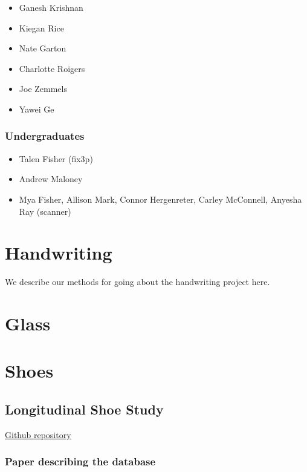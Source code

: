\documentclass[]{book}
\providecommand{\tightlist}{%
  \setlength{\itemsep}{0pt}\setlength{\parskip}{0pt}}
\begin{document}
\begin{itemize}
\tightlist
\item
  Ganesh Krishnan
\item
  Kiegan Rice
\item
  Nate Garton
\item
  Charlotte Roigers
\item
  Joe Zemmels
\item
  Yawei Ge
\end{itemize}

\hypertarget{undergraduates}{%
\subsection{Undergraduates}\label{undergraduates}}

\begin{itemize}
\tightlist
\item
  Talen Fisher (fix3p)
\item
  Andrew Maloney
\item
  Mya Fisher, Allison Mark, Connor Hergenreter, Carley McConnell, Anyesha Ray (scanner)
\end{itemize}

\hypertarget{handwriting}{%
\chapter{Handwriting}\label{handwriting}}

We describe our methods for going about the handwriting project here.

\hypertarget{glass}{%
\chapter{Glass}\label{glass}}

\hypertarget{shoes}{%
\chapter{Shoes}\label{shoes}}

\hypertarget{longitudinal}{%
\section{Longitudinal Shoe Study}\label{longitudinal}}

\href{https://github.com/CSAFE-ISU/Longitudinal_Shoe_Study}{Github repository}

\hypertarget{paper-describing-the-database}{%
\subsection{Paper describing the database}\label{paper-describing-the-database}}
\end{document}
